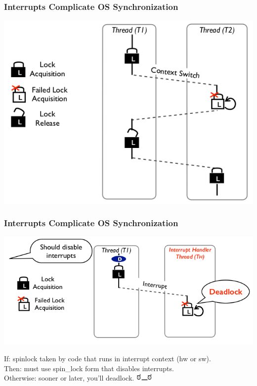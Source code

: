 \documentclass{beamer}
\newenvironment{changemargin}[1]{%
  \begin{list}{}{%
    \setlength{\topsep}{0pt}%
    \setlength{\leftmargin}{#1}%
    \setlength{\rightmargin}{1em}
    \setlength{\listparindent}{\parindent}%
    \setlength{\itemindent}{\parindent}%
    \setlength{\parsep}{\parskip}%
  }%
  \item[]}{\end{list}}
\begin{document}
\begin{frame}
  \frametitle{Interrupts Complicate OS Synchronization}
  \begin{center}
    \includegraphics[width=.8\textwidth]{L10/lock-acq1}
  \end{center}
\end{frame}

\begin{frame}
  \frametitle{Interrupts Complicate OS Synchronization}
  \begin{center}
    \includegraphics[width=.8\textwidth]{L10/lock-acq2}
  \end{center}
  \begin{changemargin}{0.5cm}
    If: spinlock taken by code that runs in interrupt context (hw or sw).\\
    Then: must use spin\_lock form that disables interrupts.\\
    Otherwise: sooner or later, you'll deadlock. \includegraphics[height=1em]{L10/look_of_disapproval}
  \end{changemargin}
\end{frame}
\end{document}

